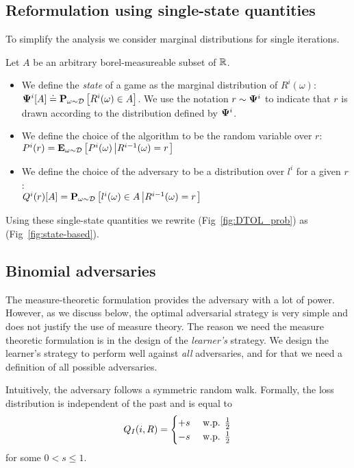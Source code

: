\documentclass{article}[12pt]
\begin{document}
\subsection{Reformulation using single-state quantities}

\newcommand{\Eomega}[1]{\E{\omega \sim \D}{#1}}
\newcommand{\Pomega}[1]{\P{\omega \sim \D}{#1}}

To simplify the analysis we consider marginal distributions for single iterations.

Let $A$ be an arbitrary borel-measureable subset of $\mathbb{R}$.

\begin{itemize}
\item We define the {\em state} of a game as the marginal distribution
  of $R^i(\omega)$: $\state^i[A] \doteq \Pomega{R^i(\omega) \in A}$.
  We use the notation $r \sim {\bf \Psi}^i$ to indicate that $r$
  is drawn according to the distribution defined by ${\bf \Psi}^i$.
\item We define the choice of the algorithm to be the random variable over $r$:
  $P^i(r) = \Eomega{P^i(\omega) \left| R^{i-1}(\omega) = r \right.}$
\item We define the choice of the adversary to be a distribution over $l^i$ for a given $r$:\\
  $Q^i(r)[A] = \Pomega{l^i(\omega) \in A  \left| R^{i-1}(\omega) = r \right.}$
\end{itemize}

Using these single-state quantities we rewrite (Fig~\ref{fig:DTOL_prob})
as (Fig~\ref{fig:state-based}).

\subsection{Binomial adversaries}

The measure-theoretic formulation provides the adversary with a lot of
power. However, as we discuss below, the optimal adversarial strategy
is very simple and does not justify the use of measure theory. The
reason we need the measure theoretic formulation is in the design of
the {\em learner's} strategy. We design the learner's strategy to
perform well against {\em all} adversaries, and for that we need a
definition of all possible adversaries.

Intuitively, the adversary follows a symmetric random walk. Formally, the loss distribution is independent of the past and is equal to
\begin{equation} \label{eqn:adv-strat-p}
  Q_I(i,R) =
  \begin{cases}
    +s & \mbox{ w.p. } \frac{1}{2}\\
    -s & \mbox{ w.p. } \frac{1}{2}\\
  \end{cases}
\end{equation}
for some $0 <s\leq 1$.
\end{document}
